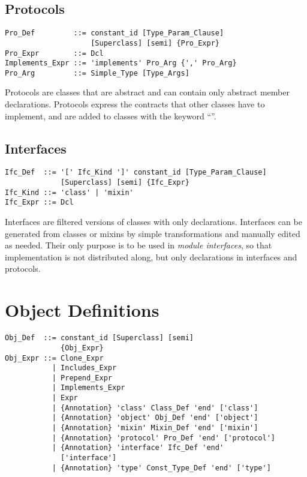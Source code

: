 \subsection{Protocols}
\label{sec:protocols}

\syntax\begin{lstlisting}
Pro_Def         ::= constant_id [Type_Param_Clause]
                    [Superclass] [semi] {Pro_Expr}
Pro_Expr        ::= Dcl
Implements_Expr ::= 'implements' Pro_Arg {',' Pro_Arg}
Pro_Arg         ::= Simple_Type [Type_Args]
\end{lstlisting}


Protocols are classes that are abstract and can contain only abstract member declarations. Protocols express the contracts that other classes have to implement, and are added to classes with the keyword ``''. 

\subsection{Interfaces}
\label{sec:interfaces}

\syntax\begin{lstlisting}
Ifc_Def  ::= '[' Ifc_Kind ']' constant_id [Type_Param_Clause] 
             [Superclass] [semi] {Ifc_Expr}
Ifc_Kind ::= 'class' | 'mixin'
Ifc_Expr ::= Dcl
\end{lstlisting}

Interfaces are filtered versions of classes with only declarations. Interfaces can be generated from classes or mixins by simple transformations and manually edited as needed. Their only purpose is to be used in {\em module interfaces}, so that implementation is not distributed along, but only declarations in interfaces and protocols. 


\section{Object Definitions}
\label{sec:object-definitions}

\syntax\begin{lstlisting}
Obj_Def  ::= constant_id [Superclass] [semi]
             {Obj_Expr}
Obj_Expr ::= Clone_Expr
           | Includes_Expr
           | Prepend_Expr
           | Implements_Expr
           | Expr
           | {Annotation} 'class' Class_Def 'end' ['class']
           | {Annotation} 'object' Obj_Def 'end' ['object']
           | {Annotation} 'mixin' Mixin_Def 'end' ['mixin']
           | {Annotation} 'protocol' Pro_Def 'end' ['protocol']
           | {Annotation} 'interface' Ifc_Def 'end' 
             ['interface']
           | {Annotation} 'type' Const_Type_Def 'end' ['type']
\end{lstlisting}

